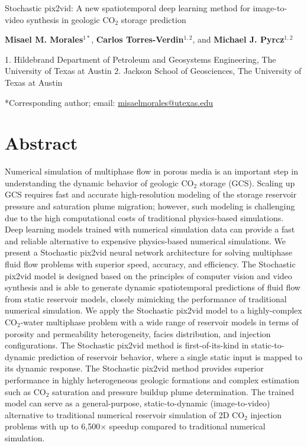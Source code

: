 \documentclass[10pt, twoside]{article}
\begin{document}
\doublespacing

\begin{center}
    {\huge Stochastic pix2vid: A new spatiotemporal deep learning method for image-to-video synthesis in geologic CO$_2$ storage prediction}
    \vspace{5mm}
    
    \textbf{Misael M. Morales$^{1*}$}, 
    \textbf{Carlos Torres-Verdin$^{1,2}$}, and
    \textbf{Michael J. Pyrcz$^{1,2}$}
\end{center}

\begin{flushleft}
    1. Hildebrand Department of Petroleum and Geosystems Engineering, The University of Texas at Austin
    2. Jackson School of Geosciences, The University of Texas at Austin
    
    *Corresponding author; email: \url{misaelmorales@utexas.edu}
\end{flushleft}

\section*{\textbf{Abstract}}
Numerical simulation of multiphase flow in porous media is an important step in understanding the dynamic behavior of geologic CO$_2$ storage (GCS). Scaling up GCS requires fast and accurate high-resolution modeling of the storage reservoir pressure and saturation plume migration; however, such modeling is challenging due to the high computational costs of traditional physics-based simulations. Deep learning models trained with numerical simulation data can provide a fast and reliable alternative to expensive physics-based numerical simulations. We present a Stochastic pix2vid neural network architecture for solving multiphase fluid flow problems with superior speed, accuracy, and efficiency. The Stochastic pix2vid model is designed based on the principles of computer vision and video synthesis and is able to generate dynamic spatiotemporal predictions of fluid flow from static reservoir models, closely mimicking the performance of traditional numerical simulation. We apply the Stochastic pix2vid model to a highly-complex CO$_2$-water multiphase problem with a wide range of reservoir models in terms of porosity and permeability heterogeneity, facies distribution, and injection configurations. The Stochastic pix2vid method is first-of-its-kind in static-to-dynamic prediction of reservoir behavior, where a single static input is mapped to its dynamic response. The Stochastic pix2vid method provides superior performance in highly heterogeneous geologic formations and complex estimation such as CO$_2$ saturation and pressure buildup plume determination. The trained model can serve as a general-purpose, static-to-dynamic (image-to-video) alternative to traditional numerical reservoir simulation of 2D CO$_2$ injection problems with up to 6,500$\times$ speedup compared to traditional numerical simulation.
\end{document}
